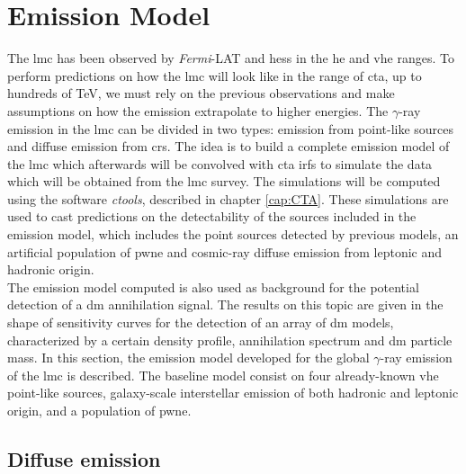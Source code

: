 \documentclass[main.tex]{subfiles}
\begin{document}
\section{Emission Model} \label{sec:model}

The \gls{lmc} has been observed by \textit{Fermi}-LAT and \gls{hess} in the \gls{he} and \gls{vhe} ranges. To perform predictions on how the \gls{lmc} will look like in the range of \gls{cta}, up to hundreds of TeV, we must rely on the previous observations and make assumptions on how the emission extrapolate to higher energies. The $\gamma$-ray emission in the \gls{lmc} can be divided in two types: emission from point-like sources and diffuse emission from \glspl{cr}. The idea is to build a complete emission model of the \gls{lmc} which afterwards will be convolved with \gls{cta} \glspl{irf} to simulate the data which will be obtained from the \gls{lmc} survey. The simulations will be computed using the software \textit{ctools}, described in chapter \ref{cap:CTA}. These simulations are used to cast predictions on the detectability of the sources included in the emission model, which includes the point sources detected by previous models, an artificial population of \gls{pwne} and cosmic-ray diffuse emission from leptonic and hadronic origin.\\
The emission model computed is also used as background for the potential detection of a \gls{dm} annihilation signal. The results on this topic are given in the shape of sensitivity curves for the detection of an array of \gls{dm} models, characterized by a certain density profile, annihilation spectrum and \gls{dm} particle mass.
In this section, the emission model developed for the global $\gamma$-ray emission of the \gls{lmc} is described. The baseline model consist on four already-known \gls{vhe} point-like sources, galaxy-scale interstellar emission of both hadronic and leptonic origin, and a population of \gls{pwne}. 

\subsection{Diffuse emission} \label{sec:diffusemodel}
\end{document}
